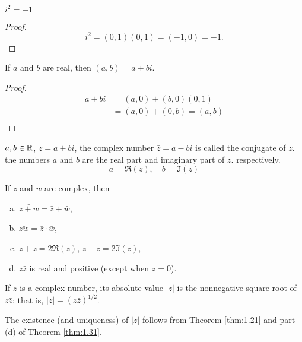 \begin{thm}
    \label{thm:1.28}
    $i^2=-1$
\end{thm}

\begin{proof}
    \begin{equation*}
        i^2=(0,1)(0,1)=(-1,0)=-1.
    \end{equation*}
\end{proof}

\begin{thm}
    \label{thm:1.29}
    If $a$ and $b$ are real, then $(a,b) =a + bi$.
\end{thm}

\begin{proof}
    \begin{align*}
        a+bi
        &=(a,0)+(b,0)(0,1)\\
        &=(a,0)+(0,b)=(a,b)\\
    \end{align*}
\end{proof}

\begin{myDef}
    \label{myDef:1.30}
    $a,b\in {\protect\mathbb R}$, $z = a + bi$,
    the complex number $\bar{z} = a  -bi$ is called the conjugate of $z$.
    the numbers $a$ and $b$ are the real part and imaginary part of $z$.
    respectively.
    \begin{equation*}
        a=\Re(z), \quad
        b=\Im(z)
    \end{equation*}
\end{myDef}

\begin{thm}
    \label{thm:1.31}
    If $z$ and $w$ are complex, then
    \begin{enumerate}[(a)]
        \item $\bar{z+w}=\bar{z}+\bar{w}$,
        \item $\bar{zw}=\bar{z}\cdot\bar{w}$,
        \item $z+\bar{z}=2\Re(z)$, $z-\bar{z}=2\Im(z)$,
        \item $z\bar{z}$ is real and positive (except when $z=0$).
    \end{enumerate}
\end{thm}


\begin{myDef}
    \label{myDef:1.32}
    If $z$ is a complex number, 
    its absolute value $|z|$ is the nonnegative square root of $z\bar{z}$; 
    that is, $|z| = (z\bar{z})^{1/2}$.
\end{myDef}
The existence (and uniqueness) of $|z|$ follows from Theorem \ref{thm:1.21} and part (d) of Theorem \ref{thm:1.31}.


